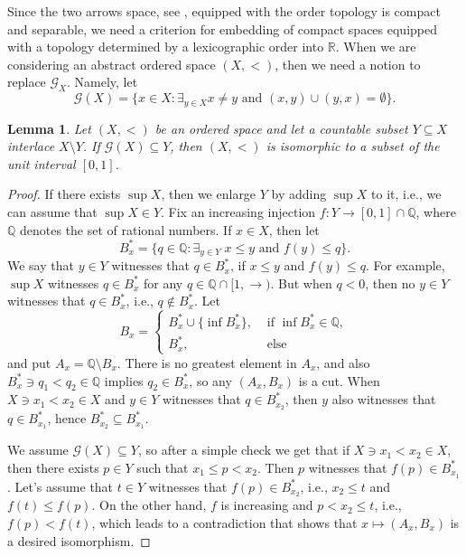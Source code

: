 \documentclass[12pt,a4paper,leqno]{amsart}
\newtheorem{lem}[thm]{Lemma}
\theoremstyle{definition}
\begin{document}
Since the two arrows space, see \cite[3.10.C]{enge}, equipped with the order topology is compact and separable, we need a criterion for embedding  of compact spaces equipped with a topology determined by a lexicographic order into $\mathbb R$. When we are considering an abstract ordered space $(X,<)$, then  we  need 
a  notion to replace $\mathcal G_X$. Namely, let  $$\mathcal G(X) =\{x\in X\colon \mathop{\exists}_{y\in X} x\not= y   \mbox{ and  } (x,y)\cup (y,x)=\emptyset \}. $$
 \begin{lem}\label{le3}
Let  $(X,<)$ be an ordered space and let a countable subset $Y \subseteq X$  interlace $X\setminus Y$. If  $\mathcal G(X) \subseteq Y$, then   $(X,<)$ is isomorphic  to a  subset of  the unit interval $[0,1]$. %
  \end{lem}
  \begin{proof}
	If there exists $\sup X$, then we  enlarge $Y$ by adding $\sup X$ to it, i.e., we can assume that $\sup X \in Y$. Fix an increasing injection  $f\colon Y \to [0,1]\cap \mathbb Q$, where $\mathbb Q$ denotes the set of rational numbers. If $x\in X$, then 
let $$  B_x^{*} = \{ q\in \mathbb Q\colon \exists_{y\in Y} \; x\leqslant y \mbox{ and }  f(y)\leqslant q \}. $$ We  say that $y\in Y$ witnesses that  $q\in B^*_x$, if $x\leqslant y$ and $f(y) \leqslant q$. For example, $\sup X$ witnesses $q\in B^*_x$ for any $q\in \mathbb Q\cap [1,\rightarrow)$. But when $q<0$, then  no $y\in Y$ witnesses that $q\in B^*_x$, i.e., $q\notin B^*_x$. Let
$$B_x=\begin{cases} B^*_x \cup \{ \inf B^*_x\}, & \mbox{ if } \inf B^*_x \in \mathbb Q,\\
B^*_x,& \mbox { else } \end{cases}  $$ and put $A_x=\mathbb Q\setminus B_x.$ There is no greatest element in $A_x$, and also $B^*_x \ni q_1 < q_2 \in \mathbb Q$ implies $q_2 \in B^*_x$, so any $(A_x, B_x)$ is a  cut. When $X\ni x_1 <x_2 \in X$ and $y\in Y$ witnesses that $q\in B^*_{x_2}$, then $y$ also witnesses that $q\in B^*_{x_1}$, hence $B^*_{x_2} \subseteq B^*_{x_1}$.

We assume $\mathcal G(X) \subseteq Y$, so after a simple check we get that if $X \ni x_1  < x_2 \in X$, then there exists 
 $p\in Y$ such  that  $ x_1 \leqslant p <  x_2 $. Then $p$ witnesses that $f(p) \in B^*_{x_1}$. Let's assume that $t\in Y$ witnesses that $f(p) \in B^*_{x_2} $, i.e., $x_2 \leqslant t$ and $f(t) \leqslant f(p)$.   On the other hand, $f$ is increasing and $p < x_2 \leqslant t$, i.e., $f(p) < f(t)$,  which leads to a contradiction that shows that $x\mapsto (A_x,B_x)$ is a desired isomorphism.  
  \end{proof}
\end{document}
